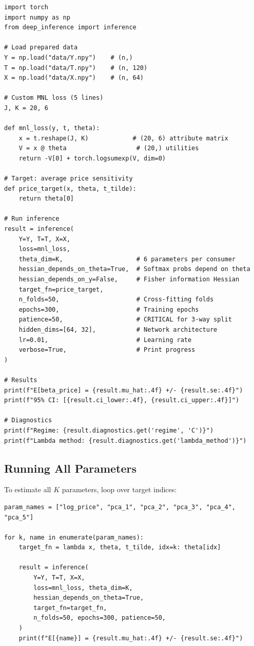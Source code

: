 \begin{lstlisting}
import torch
import numpy as np
from deep_inference import inference

# Load prepared data
Y = np.load("data/Y.npy")    # (n,)
T = np.load("data/T.npy")    # (n, 120)
X = np.load("data/X.npy")    # (n, 64)

# Custom MNL loss (5 lines)
J, K = 20, 6

def mnl_loss(y, t, theta):
    x = t.reshape(J, K)            # (20, 6) attribute matrix
    V = x @ theta                   # (20,) utilities
    return -V[0] + torch.logsumexp(V, dim=0)

# Target: average price sensitivity
def price_target(x, theta, t_tilde):
    return theta[0]

# Run inference
result = inference(
    Y=Y, T=T, X=X,
    loss=mnl_loss,
    theta_dim=K,                    # 6 parameters per consumer
    hessian_depends_on_theta=True,  # Softmax probs depend on theta
    hessian_depends_on_y=False,     # Fisher information Hessian
    target_fn=price_target,
    n_folds=50,                     # Cross-fitting folds
    epochs=300,                     # Training epochs
    patience=50,                    # CRITICAL for 3-way split
    hidden_dims=[64, 32],           # Network architecture
    lr=0.01,                        # Learning rate
    verbose=True,                   # Print progress
)

# Results
print(f"E[beta_price] = {result.mu_hat:.4f} +/- {result.se:.4f}")
print(f"95% CI: [{result.ci_lower:.4f}, {result.ci_upper:.4f}]")

# Diagnostics
print(f"Regime: {result.diagnostics.get('regime', 'C')}")
print(f"Lambda method: {result.diagnostics.get('lambda_method')}")
\end{lstlisting}

\subsection{Running All Parameters}

To estimate all $K$ parameters, loop over target indices:

\begin{lstlisting}
param_names = ["log_price", "pca_1", "pca_2", "pca_3", "pca_4", "pca_5"]

for k, name in enumerate(param_names):
    target_fn = lambda x, theta, t_tilde, idx=k: theta[idx]

    result = inference(
        Y=Y, T=T, X=X,
        loss=mnl_loss, theta_dim=K,
        hessian_depends_on_theta=True,
        target_fn=target_fn,
        n_folds=50, epochs=300, patience=50,
    )
    print(f"E[{name}] = {result.mu_hat:.4f} +/- {result.se:.4f}")
\end{lstlisting}

